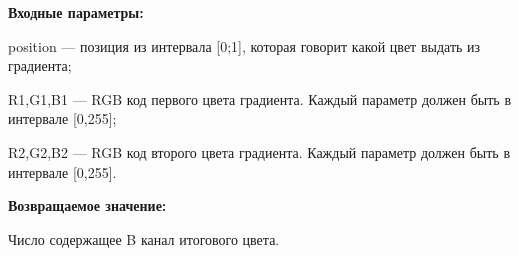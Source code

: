 \textbf{Входные параметры:}  

position --- позиция из интервала [0;1], которая говорит какой цвет выдать из градиента;
 
    R1,G1,B1 --- RGB код первого цвета градиента. Каждый параметр должен быть в интервале [0,255];
 
    R2,G2,B2 --- RGB код второго цвета градиента. Каждый параметр должен быть в интервале [0,255].

\textbf{Возвращаемое значение:}

Число содержащее B канал итогового цвета.